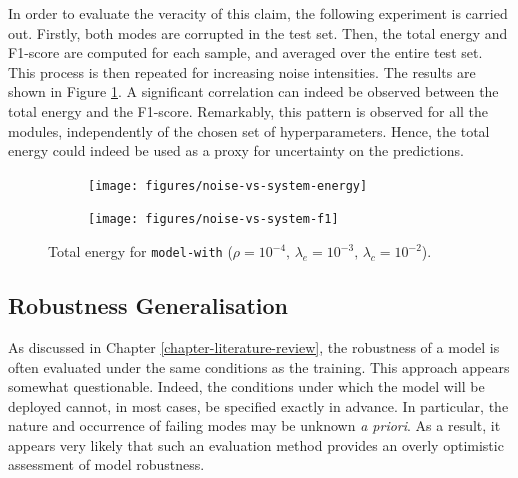 In order to evaluate the veracity of this claim, the following experiment is carried out. Firstly, both modes are corrupted in the test set. Then, the total energy and F1-score are computed for each sample, and averaged over the entire test set. This process is then repeated for increasing noise intensities. The results are shown in Figure \ref{fig:exp-att-shift-5}. A significant correlation can indeed be observed between the total energy and the F1-score. Remarkably, this pattern is observed for all the modules, independently of the chosen set of hyperparameters. Hence, the total energy could indeed be used as a proxy for uncertainty on the predictions. 
\begin{figure}[H]
\centering
\begin{subfigure}{.5\textwidth}
  \centering
  \texttt{[image: figures/noise-vs-system-energy]}
\end{subfigure}%
\begin{subfigure}{.5\textwidth}
  \centering
  \texttt{[image: figures/noise-vs-system-f1]}
\end{subfigure}
\caption[Total energy]{Total energy for \texttt{model-with} ($\rho=10^{-4},\,\lambda_e=10^{-3},\,\lambda_c=10^{-2}$).}
\label{fig:exp-att-shift-5}
\end{figure}

\subsection*{Robustness Generalisation}\label{sec:generalization}
As discussed in Chapter \ref{chapter-literature-review}, the robustness of a model is often evaluated under the same conditions as the training. This approach appears somewhat questionable. Indeed, the conditions under which the model will be deployed cannot, in most cases,  be specified exactly in advance. In particular, the nature and occurrence of failing modes may be unknown \textit{a priori}. As a result, it appears very likely that such an evaluation method provides an overly optimistic assessment of model robustness.

